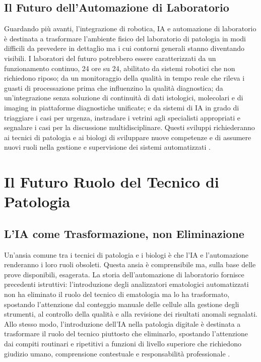 \subsection{Il Futuro dell'Automazione di Laboratorio}

Guardando più avanti, l'integrazione di robotica, IA e automazione di laboratorio è destinata a trasformare l'ambiente fisico del laboratorio di patologia in modi difficili da prevedere in dettaglio ma i cui contorni generali stanno diventando visibili. I laboratori del futuro potrebbero essere caratterizzati da un funzionamento continuo, 24 ore su 24, abilitato da sistemi robotici che non richiedono riposo; da un monitoraggio della qualità in tempo reale che rileva i guasti di processazione prima che influenzino la qualità diagnostica; da un'integrazione senza soluzione di continuità di dati istologici, molecolari e di imaging in piattaforme diagnostiche unificate; e da sistemi di IA in grado di triaggiare i casi per urgenza, instradare i vetrini agli specialisti appropriati e segnalare i casi per la discussione multidisciplinare. Questi sviluppi richiederanno ai tecnici di patologia e ai biologi di sviluppare nuove competenze e di assumere nuovi ruoli nella gestione e supervisione dei sistemi automatizzati \cite{elendu2023}.

\section{Il Futuro Ruolo del Tecnico di Patologia}
\label{sec:ch5_technician}

\subsection{L'IA come Trasformazione, non Eliminazione}

Un'ansia comune tra i tecnici di patologia e i biologi è che l'IA e l'automazione renderanno i loro ruoli obsoleti. Questa ansia è comprensibile ma, sulla base delle prove disponibili, esagerata. La storia dell'automazione di laboratorio fornisce precedenti istruttivi: l'introduzione degli analizzatori ematologici automatizzati non ha eliminato il ruolo del tecnico di ematologia ma lo ha trasformato, spostando l'attenzione dal conteggio manuale delle cellule alla gestione degli strumenti, al controllo della qualità e alla revisione dei risultati anomali segnalati. Allo stesso modo, l'introduzione dell'IA nella patologia digitale è destinata a trasformare il ruolo del tecnico piuttosto che eliminarlo, spostando l'attenzione dai compiti routinari e ripetitivi a funzioni di livello superiore che richiedono giudizio umano, comprensione contestuale e responsabilità professionale \cite{song2023}.

